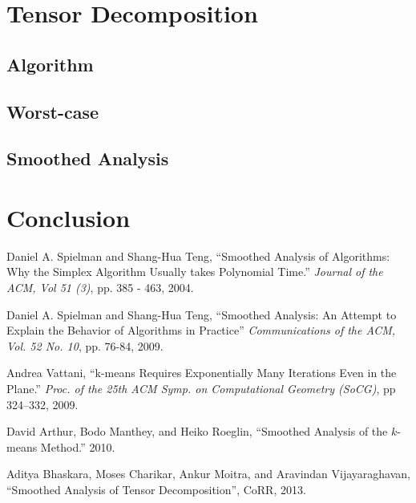 \documentclass[11pt]{article}
\theoremstyle{definition}
\begin{document}
\section{Tensor Decomposition}
\subsection{Algorithm}
\subsection{Worst-case}
\subsection{Smoothed Analysis}

\section{Conclusion}

\begin{thebibliography}{1}
    Daniel A. Spielman and Shang{-}Hua Teng,
    ``Smoothed Analysis of Algorithms: Why the Simplex Algorithm Usually takes Polynomial Time.''
    \emph{Journal of the ACM, Vol 51 (3)},
    pp. 385 - 463,
    2004.

    Daniel A. Spielman and Shang{-}Hua Teng,
    ``Smoothed Analysis: An Attempt to Explain the Behavior of Algorithms in Practice''
    \emph{Communications of the ACM, Vol. 52 No. 10},
    pp. 76-84,
    2009.

    Andrea Vattani,
    ``k-means Requires Exponentially Many Iterations Even in the Plane.'' 
    \emph{ Proc. of the 25th ACM Symp. on Computational Geometry (SoCG)}, 
    pp 324–332, 
    2009.
    
    David Arthur, Bodo Manthey, and Heiko Roeglin,
    ``Smoothed Analysis of the $k$-means Method.''
    2010.


    Aditya Bhaskara, Moses Charikar, Ankur Moitra, and Aravindan Vijayaraghavan,
    ``Smoothed Analysis of Tensor Decomposition'',
    CoRR,
    2013.

\end{thebibliography}
\end{document}
